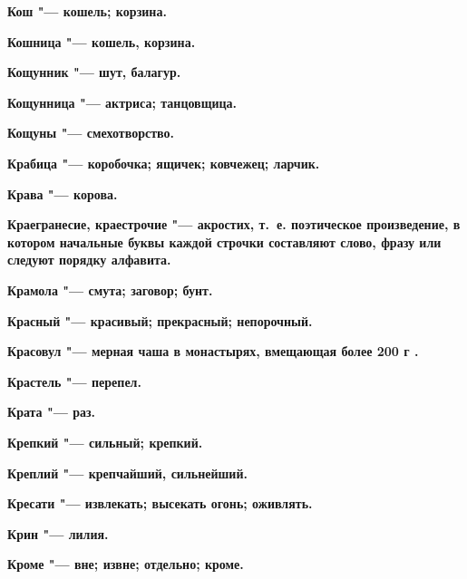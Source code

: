 \begin{mymulticols}{2}
\bfseries Кош\normalfont{} "--- кошель; корзина. 




\bfseries Кошница\normalfont{} "--- кошель, корзина. 




\bfseries Кощунник\normalfont{} "--- шут, балагур. 




\bfseries Кощунница\normalfont{} "--- актриса; танцовщица. 




\bfseries Кощуны\normalfont{} "--- смехотворство. 




\bfseries Крабица\normalfont{} "--- коробочка; ящичек; ковчежец; ларчик. 




\bfseries Крава\normalfont{} "--- корова. 




\bfseries Краегранесие, краестрочие\normalfont{} "--- акростих, т.~е. поэтическое произведение, в котором начальные буквы каждой строчки составляют слово, фразу или следуют порядку алфавита. 




\bfseries Крамола\normalfont{} "--- смута; заговор; бунт. 




\bfseries Красный\normalfont{} "--- красивый; прекрасный; непорочный. 




\bfseries Красовул\normalfont{} "--- мерная чаша в монастырях, вмещающая более 200 г . 




\bfseries Крастель\normalfont{} "--- перепел. 




\bfseries Крата\normalfont{} "--- раз. 




\bfseries Крепкий\normalfont{} "--- сильный; крепкий. 




\bfseries Креплий\normalfont{} "--- крепчайший, сильнейший. 




\bfseries Кресати\normalfont{} "--- извлекать; высекать огонь; оживлять. 




\bfseries Крин\normalfont{} "--- лилия. 




\bfseries Кроме\normalfont{} "--- вне; извне; отдельно; кроме. 





\end{mymulticols}
